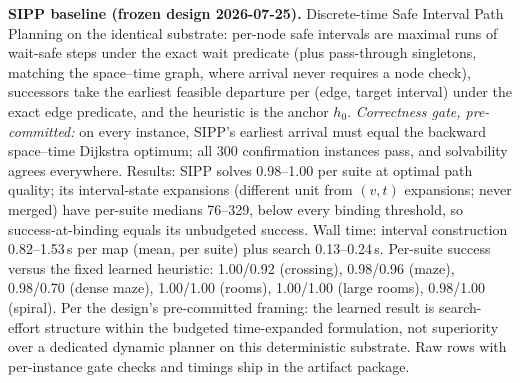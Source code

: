 \documentclass[letterpaper]{article} %
\begin{document}
\textbf{SIPP baseline (frozen design 2026-07-25).} Discrete-time Safe Interval Path Planning on the identical substrate: per-node safe intervals are maximal runs of wait-safe steps under the exact wait predicate (plus pass-through singletons, matching the space--time graph, where arrival never requires a node check), successors take the earliest feasible departure per (edge, target interval) under the exact edge predicate, and the heuristic is the anchor $h_0$. \emph{Correctness gate, pre-committed:} on every instance, SIPP's earliest arrival must equal the backward space--time Dijkstra optimum; all 300 confirmation instances pass, and solvability agrees everywhere. Results: SIPP solves 0.98--1.00 per suite at optimal path quality; its interval-state expansions (different unit from $(v,t)$ expansions; never merged) have per-suite medians 76--329, below every binding threshold, so success-at-binding equals its unbudgeted success. Wall time: interval construction 0.82--1.53\,s per map (mean, per suite) plus search 0.13--0.24\,s. Per-suite success versus the fixed learned heuristic: 1.00/0.92 (crossing), 0.98/0.96 (maze), 0.98/0.70 (dense maze), 1.00/1.00 (rooms), 1.00/1.00 (large rooms), 0.98/1.00 (spiral). Per the design's pre-committed framing: the learned result is search-effort structure within the budgeted time-expanded formulation, not superiority over a dedicated dynamic planner on this deterministic substrate. Raw rows with per-instance gate checks and timings ship in the artifact package.
\end{document}
